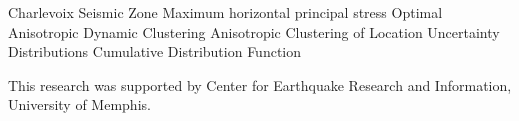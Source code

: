 \documentclass[draft]{agujournal2018}
\begin{document}
\begin{acronyms}
  Charlevoix Seismic Zone
  Maximum horizontal principal stress 
  Optimal Anisotropic Dynamic Clustering  
   Anisotropic Clustering of Location Uncertainty Distributions
  Cumulative Distribution Function
\end{acronyms}


\acknowledgments
This research was supported by Center for Earthquake Research and Information, University of Memphis.




















\end{document}
